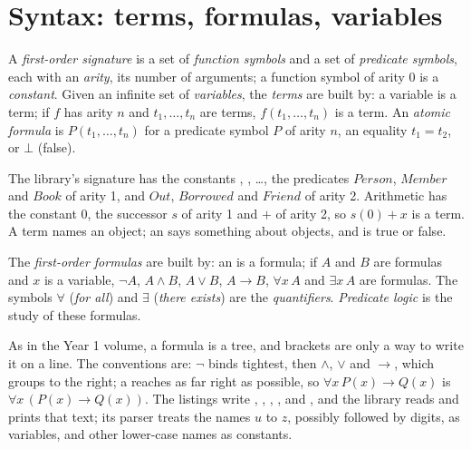 \section{Syntax: terms, formulas, variables}\label{sec:b2:predicate-logic:syntax}

\begin{definition}\label{def:b2:predicate-logic:term}
A \emph{first-order signature} is a set of \emph{function symbols} and a set of
\emph{predicate symbols}, each with an \emph{arity}, its number of arguments; a function symbol of arity $0$ is a
\emph{constant}. Given an infinite set of \emph{variables}, the \emph{terms} are built by: a variable
is a term; if $f$ has arity $n$ and $t_1, \dots, t_n$ are terms, $f(t_1, \dots, t_n)$ is a term. An \emph{atomic
formula} is $P(t_1, \dots, t_n)$ for a predicate symbol $P$ of arity $n$, an equality $t_1 = t_2$,
or $\bot$ (false).
\end{definition}

The library's signature has the constants , , \dots, the predicates $\mathit{Person}$,
$\mathit{Member}$ and $\mathit{Book}$ of arity 1, and $\mathit{Out}$, $\mathit{Borrowed}$ and $\mathit{Friend}$ of arity
2. Arithmetic has the constant $0$, the successor $s$ of arity 1 and $+$ of arity 2, so $s(0) + x$ is a term. A term
names an object; an  says something about objects, and is true or false.

\begin{definition}\label{def:b2:predicate-logic:formula}
The \emph{first-order formulas} are built by: an  is a formula; if $A$ and $B$
are formulas and $x$ is a variable, $\neg A$, $A \wedge B$, $A \vee B$, $A \to B$, $\forall x\, A$ and $\exists x\, A$
are formulas. The symbols $\forall$ (\emph{for all}) and $\exists$ (\emph{there exists}) are the
\emph{quantifiers}. \emph{Predicate logic} is the study of these formulas.
\end{definition}

As in the Year 1 volume, a formula is a tree, and brackets are only a way to write it on a line. The conventions
are: $\neg$ binds tightest, then $\wedge$, $\vee$ and $\to$, which groups to the right; a  reaches as far
right as possible, so $\forall x\, P(x) \to Q(x)$ is $\forall x\, (P(x) \to Q(x))$. The listings write \code{~},
\code{&}, \code{|}, \code{->},  and , and the library  reads and prints
that text; its parser treats the names $u$ to $z$, possibly followed by digits, as variables, and other lower-case names
as constants.

